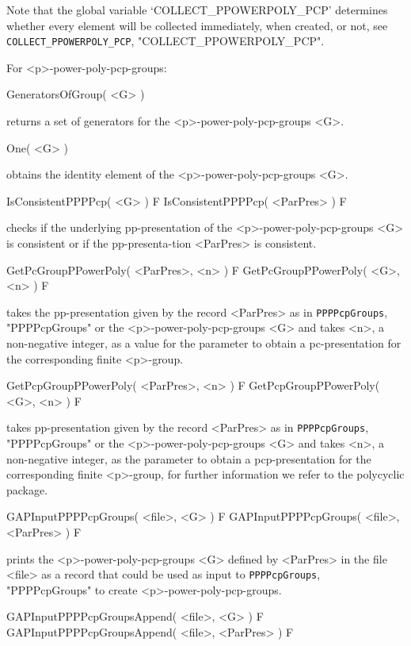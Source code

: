 Note that the global
variable `COLLECT_PPOWERPOLY_PCP' determines whether every element will be 
collected immediately, when created, or not, see
{\tt COLLECT_PPOWERPOLY_PCP},
"COLLECT_PPOWERPOLY_PCP".


For <p>-power-poly-pcp-groups:

\> GeneratorsOfGroup( <G> )

returns a set of generators for the <p>-power-poly-pcp-groups <G>. 

\> One( <G> )

obtains the identity element of the <p>-power-poly-pcp-groups <G>.

\>IsConsistentPPPPcp( <G> ) F
\>IsConsistentPPPPcp( <ParPres> ) F

checks if the underlying pp-presentation of the 
<p>-power-poly-pcp-groups <G> is consistent or if the pp-presenta-tion 
<ParPres> is consistent.

\>GetPcGroupPPowerPoly( <ParPres>, <n> ) F
\>GetPcGroupPPowerPoly( <G>, <n> ) F

takes the pp-presentation given by the record <ParPres> as in
{\tt PPPPcpGroups},
"PPPPcpGroups" or the <p>-power-poly-pcp-groups <G> and takes <n>, a 
non-negative integer, as a value for the parameter to obtain a 
pc-presentation for the corresponding finite <p>-group.

\>GetPcpGroupPPowerPoly( <ParPres>, <n> ) F
\>GetPcpGroupPPowerPoly( <G>, <n> ) F

takes pp-presentation given by the record <ParPres> as in
{\tt PPPPcpGroups},
"PPPPcpGroups" or the <p>-power-poly-pcp-groups <G> and takes <n>, a 
non-negative integer, as the parameter to obtain a pcp-presentation for the 
corresponding finite <p>-group, for further information we refer to the 
polycyclic package.

\>GAPInputPPPPcpGroups( <file>, <G> ) F
\>GAPInputPPPPcpGroups( <file>, <ParPres> ) F

prints the <p>-power-poly-pcp-groups <G> defined by <ParPres> in the file 
<file> as a record that could be used as input to
{\tt PPPPcpGroups},
"PPPPcpGroups" to create <p>-power-poly-pcp-groups.

\>GAPInputPPPPcpGroupsAppend( <file>, <G> ) F
\>GAPInputPPPPcpGroupsAppend( <file>, <ParPres> ) F

